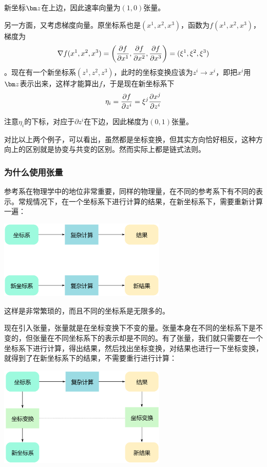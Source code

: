 新坐标$\bz$在上边，因此速率向量为$(1,0)$张量。

另一方面，又考虑梯度向量。原坐标系也是$(x^1,x^2,x^3)$，函数为$f(x^1,x^2,x^3)$，梯度为
$$\nabla f(x^1,x^2,x^3)=\left(\pdv{f}{x^1},\pdv{f}{x^2},\pdv{f}{x^3}\right)=(\xi^1,\xi^2,\xi^3)$$。现在有一个新坐标系$(z^1,z^2,z^3)$，此时的坐标变换应该为$z^i\rightarrow x^i$，即把$x^i$用$\bz$表示出来，这样才能算出$f$，于是现在新坐标系下
$$\eta_i=\pdv{f}{z^i}=\xi^j\pdv{x^j}{z^i}$$

注意$\eta_i$的下标，对应于$\partial z^i$在下边，因此梯度为$(0,1)$张量。

对比以上两个例子，可以看出，虽然都是坐标变换，但其实方向恰好相反，这种方向上的区别就是协变与共变的区别。然而实际上都是链式法则。

\subsubsection{为什么使用张量}
参考系在物理学中的地位非常重要，同样的物理量，在不同的参考系下有不同的表示。常规情况下，在一个坐标系下进行计算的结果，在新坐标系下，需要重新计算一遍：
\begin{center}
\includegraphics[width=8cm]{figure/NoTensor.png}
\end{center}
这样是非常繁琐的，而且不同的坐标系是无限多的。

现在引入张量，张量就是在坐标变换下不变的量。张量本身在不同的坐标系下是不变的，但张量在不同坐标系下的表示却是不同的。有了张量，我们就只需要在一个坐标系下进行计算，得出结果，然后找出坐标变换，对结果也进行一下坐标变换，就得到了在新坐标系下的结果，不需要重行进行计算：
\begin{center}
\includegraphics[width=8cm]{figure/WithTensor.png}
\end{center}
